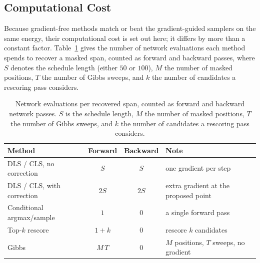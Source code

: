 \clearpage
\subsection{Computational Cost}
\label{app:cost}

Because gradient-free methods match or beat the gradient-guided samplers on the same energy, their computational cost is set out here; it differs by more than a constant factor. Table~\ref{tab:cost} gives the number of network evaluations each method spends to recover a masked span, counted as forward and backward passes, where $S$ denotes the schedule length (either $50$ or $100$), $M$ the number of masked positions, $T$ the number of Gibbs sweeps, and $k$ the number of candidates a rescoring pass considers.

\begin{table}[h]
    \centering
    \small
    \setlength{\tabcolsep}{4pt}
    \begin{tabular}{lccp{3.9cm}}
        \toprule
        Method & Forward & Backward & Note \\
        \midrule
        DLS / CLS, no correction  & $S$    & $S$  & one gradient per step \\
        DLS / CLS, with correction & $2S$   & $2S$ & extra gradient at the proposed point \\
        Conditional argmax/sample  & $1$    & $0$  & a single forward pass \\
        Top-$k$ rescore            & $1+k$  & $0$  & rescore $k$ candidates \\
        Gibbs                      & $M\,T$ & $0$  & $M$ positions, $T$ sweeps, no gradient \\
        \bottomrule
    \end{tabular}
    \caption[Network evaluations per recovered span.]{Network evaluations per recovered span, counted as forward and backward network passes. $S$ is the schedule length, $M$ the number of masked positions, $T$ the number of Gibbs sweeps, and $k$ the number of candidates a rescoring pass considers.}
    \label{tab:cost}
\end{table}

